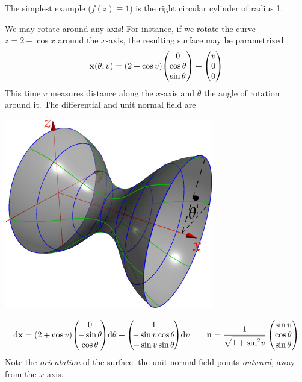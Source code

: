 \begin{examples}{}{}
\exstart The simplest example ($f(z)\equiv 1$) is the right circular cylinder of radius 1.
\begin{enumerate}\setcounter{enumi}{1}
  \begin{minipage}[t]{0.56\linewidth}\vspace{0pt}
  \item We may rotate around any axis! For instance, if we rotate the curve $z=2+\cos x$  around the $x$-axis, the resulting surface may be parametrized
  \[
  {\mathbf{x}}(\theta,v)=(2+\cos v)\!\begin{pmatrix}0\\\cos\theta\\\sin\theta\end{pmatrix}+\begin{pmatrix}v\\0\\0\end{pmatrix}
	\]
	This time $v$ measures distance along the $x$-axis and $\theta$ the angle of rotation around it.\smallbreak
	The differential and unit normal field are
  \end{minipage}\hfill\begin{minipage}[t]{0.39\linewidth}\vspace{-10pt}
	\flushright\href{http://www.math.uci.edu/~ndonalds/math162a/surfaces-revol.html}{\includegraphics{surfaces-revol}}
  \end{minipage}\par%
  \begin{gather*}
  \dvx=(2+\cos v)\!\threevec 0{\!-\sin\theta\!}{\cos\theta}\!\dth+\threevec{1}{\!-\sin v\cos\theta\!}{\!-\sin v\sin\theta\!}\!\dv \qquad
  \vn=\frac 1{\sqrt{1+\sin^2\!v}}\threevec{\sin v}{\cos\theta}{\sin\theta}
  \end{gather*}
  Note the \emph{orientation} of the surface: the unit normal field points \emph{outward,} away from the $x$-axis.
\end{enumerate}
\end{examples}

